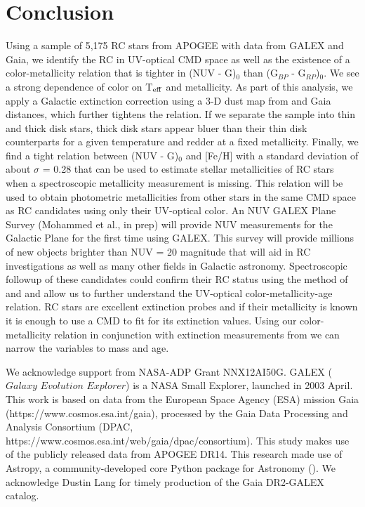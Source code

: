 \documentclass[twocolumn]{emulateapj}
\begin{document}
\section{Conclusion}
Using a sample of 5,175 RC stars from APOGEE with data from GALEX and Gaia, we identify the RC in UV-optical CMD space as well as the existence of a color-metallicity relation that is tighter in (NUV - G)$_0$ than (G$_{BP}$ - G$_{RP}$)$_0$.  We see a strong dependence of color on T$_{\rm{eff}}$ and metallicity. As part of this analysis, we apply a Galactic extinction correction using a 3-D dust map from \citealt{GSF15} and Gaia distances, which further tightens the relation. If we separate the sample into thin and thick disk stars, thick disk stars appear bluer than their thin disk counterparts for a given temperature and redder at a fixed metallicity. Finally, we find a tight relation between (NUV - G)$_0$ and [Fe/H] with a standard deviation of about $\sigma$ = 0.28 that can be used to estimate stellar metallicities of RC stars when a spectroscopic metallicity measurement is missing. This relation will be used to obtain photometric metallicities from other stars in the same CMD space as RC candidates using only their UV-optical color. 
An NUV GALEX Plane Survey (Mohammed et al., in prep) will provide NUV measurements for the Galactic Plane for the first time using GALEX. This survey will provide millions of new objects brighter than NUV = 20 magnitude that will aid in RC investigations as well as many other fields in Galactic astronomy. Spectroscopic followup of these candidates could confirm their RC status using the method of \citealt{hawkins18} and \citealt{ting18} and allow us to further understand the UV-optical color-metallicity-age relation. RC stars are excellent extinction probes and if their metallicity is known it is enough to use a CMD to fit for its extinction values. Using our color-metallicity relation in conjunction with extinction measurements from \citealt{GSF15} we can narrow the variables to mass and age. 

\acknowledgments
We acknowledge support from NASA-ADP Grant NNX12AI50G. GALEX ($Galaxy$ $Evolution$ $Explorer$) is a NASA Small Explorer, launched in 2003 April. This work is based on data from the European Space Agency (ESA) mission Gaia (https://www.cosmos.esa.int/gaia), processed by the Gaia Data Processing and Analysis Consortium (DPAC, https://www.cosmos.esa.int/web/gaia/dpac/consortium). This study makes use of the publicly released data from APOGEE DR14. This research made use of Astropy, a community-developed core Python package for Astronomy (\citealt{astropy}). We acknowledge Dustin Lang for timely production of the Gaia DR2-GALEX catalog.



\end{document}
